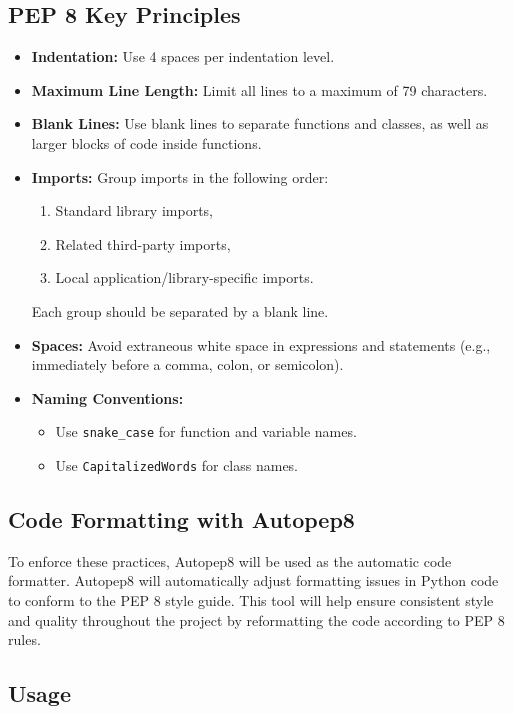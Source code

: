 \documentclass{article}
\begin{document}
\subsection*{PEP 8 Key Principles}

\begin{itemize}
    \item \textbf{Indentation:} Use 4 spaces per indentation level.
    \item \textbf{Maximum Line Length:} Limit all lines to a maximum of 79 characters.
    \item \textbf{Blank Lines:} Use blank lines to separate functions and classes, as well as larger blocks of code inside functions.
    \item \textbf{Imports:} Group imports in the following order:
    \begin{enumerate}
        \item Standard library imports,
        \item Related third-party imports,
        \item Local application/library-specific imports.
    \end{enumerate}
    Each group should be separated by a blank line.
    \item \textbf{Spaces:} Avoid extraneous white space in expressions and statements (e.g., immediately before a comma, colon, or semicolon).
    \item \textbf{Naming Conventions:}
    \begin{itemize}
        \item Use \texttt{snake\_case} for function and variable names.
        \item Use \texttt{CapitalizedWords} for class names.
    \end{itemize}
\end{itemize}

\subsection*{Code Formatting with Autopep8}

To enforce these practices, Autopep8 will be used as the automatic code formatter. Autopep8 will automatically adjust formatting issues in Python code to conform to the PEP 8 style guide. This tool will help ensure consistent style and quality throughout the project by reformatting the code according to PEP 8 rules.

\subsection*{Usage}
\end{document}
